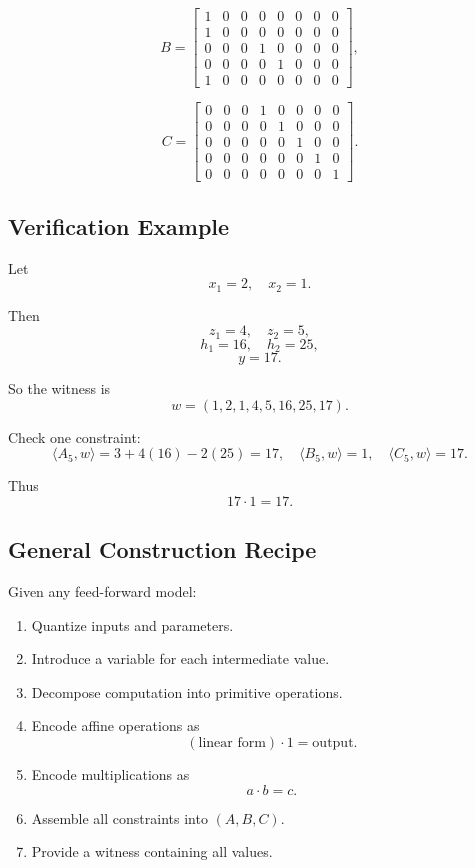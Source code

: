 \[
B =
\begin{bmatrix}
1 & 0 & 0 & 0 & 0 & 0 & 0 & 0 \\
1 & 0 & 0 & 0 & 0 & 0 & 0 & 0 \\
0 & 0 & 0 & 1 & 0 & 0 & 0 & 0 \\
0 & 0 & 0 & 0 & 1 & 0 & 0 & 0 \\
1 & 0 & 0 & 0 & 0 & 0 & 0 & 0
\end{bmatrix},
\]

\[
C =
\begin{bmatrix}
0 & 0 & 0 & 1 & 0 & 0 & 0 & 0 \\
0 & 0 & 0 & 0 & 1 & 0 & 0 & 0 \\
0 & 0 & 0 & 0 & 0 & 1 & 0 & 0 \\
0 & 0 & 0 & 0 & 0 & 0 & 1 & 0 \\
0 & 0 & 0 & 0 & 0 & 0 & 0 & 1
\end{bmatrix}.
\]

\subsection{Verification Example}

Let
\[
x_1 = 2, \quad x_2 = 1.
\]

Then
\[
z_1 = 4, \quad z_2 = 5,
\]
\[
h_1 = 16, \quad h_2 = 25,
\]
\[
y = 17.
\]

So the witness is
\[
w = (1, 2, 1, 4, 5, 16, 25, 17).
\]

Check one constraint:
\[
\langle A_5, w \rangle = 3 + 4(16) - 2(25) = 17,
\quad
\langle B_5, w \rangle = 1,
\quad
\langle C_5, w \rangle = 17.
\]

Thus
\[
17 \cdot 1 = 17.
\]

\subsection{General Construction Recipe}

Given any feed-forward model:

\begin{enumerate}
\item Quantize inputs and parameters.
\item Introduce a variable for each intermediate value.
\item Decompose computation into primitive operations.
\item Encode affine operations as
\[
(\text{linear form}) \cdot 1 = \text{output}.
\]
\item Encode multiplications as
\[
a \cdot b = c.
\]
\item Assemble all constraints into $(A, B, C)$.
\item Provide a witness containing all values.
\end{enumerate}

